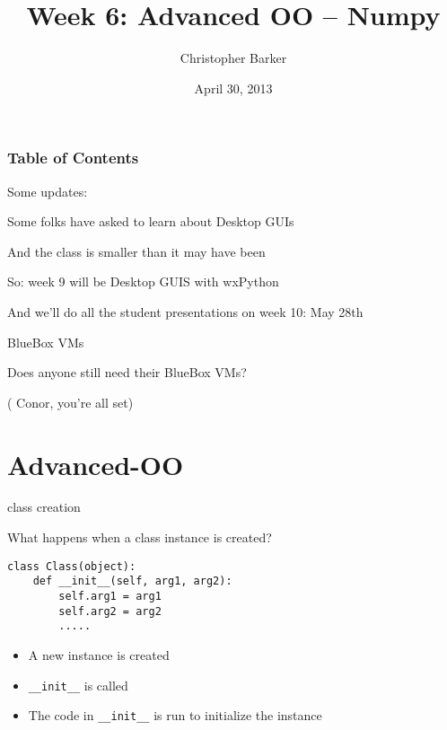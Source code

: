 \documentclass{beamer}
\title[Python Certificate: System Development]{Week 6: Advanced OO -- Numpy}
\author{Christopher Barker}
\institute{UW Continuing Education}
\date{April  30, 2013}
\begin{document}
\begin{frame}
  \titlepage
\end{frame}

\begin{frame}
\frametitle{Table of Contents}
  \tableofcontents
\end{frame}


\begin{frame}[fragile]{Some updates:}

\Large{Some folks have asked to learn about Desktop GUIs}

\vfill
\Large{And the class is smaller than it may have been}

\vfill
\Large{So: week 9 will be Desktop GUIS with wxPython}

\vfill
\Large{And we'll do all the student presentations on week 10: May 28th}


\end{frame}

\begin{frame}[fragile]{BlueBox VMs}

\Large{Does anyone still need their BlueBox VMs?}


\vfill
\large{ ( Conor, you're all set) }

\end{frame}

\section{Advanced-OO}

\begin{frame}[fragile]{class creation}

{\Large What happens when a class instance is created?}

\vfill
\begin{verbatim}
class Class(object):
    def __init__(self, arg1, arg2):
        self.arg1 = arg1
        self.arg2 = arg2
        .....
\end{verbatim}
\vfill

\begin{itemize}
  \item A new instance is created
  \item \verb|__init__| is called
  \item The code in \verb|__init__| is run to initialize the instance
\end{itemize}
\vfill

\end{frame} 
\end{document}
